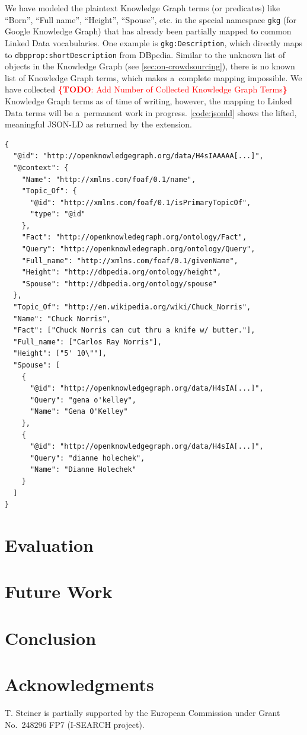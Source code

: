 \documentclass[runningheads,a4paper]{llncs}
\newcommand{\todo}[1]{\noindent\textcolor{red}{{\bf \{TODO}: #1{\bf \}}}}
\begin{document}
We have modeled the plaintext Knowledge Graph terms (or predicates)
like ``Born'', ``Full name'', ``Height'', ``Spouse'', etc.
in the special namespace \texttt{gkg} (for Google Knowledge Graph)
that has already been partially mapped to common Linked Data vocabularies.
One example is \texttt{gkg:Description},
which directly maps to \texttt{dbpprop:shortDescription} from DBpedia.
Similar to the unknown list of objects in the Knowledge Graph (see \autoref{sec:on-crowdsourcing}),
there is no known list of Knowledge Graph terms,
which makes a~complete mapping impossible.
We have collected \todo{Add Number of Collected Knowledge Graph Terms} Knowledge Graph terms
as of time of writing, however, the mapping to Linked Data terms
will be a~permanent work in progress.
\autoref{code:jsonld} shows the lifted, meaningful JSON-LD as returned by the extension.

\begin{lstlisting}[caption=Subset of the meaningful JSON-LD from the Chuck Norris Knowledge Graph data. The mapping of the Knowledge Graph terms can be seen in the @context., label=code:jsonld, float=h, escapechar=§]
{
  "@id": "http://openknowledgegraph.org/data/H4sIAAAAA[...]",
  "@context": {
    "Name": "http://xmlns.com/foaf/0.1/name",
    "Topic_Of": {
      "@id": "http://xmlns.com/foaf/0.1/isPrimaryTopicOf",
      "type": "@id"
    },
    "Fact": "http://openknowledegraph.org/ontology/Fact",
    "Query": "http://openknowledegraph.org/ontology/Query",
    "Full_name": "http://xmlns.com/foaf/0.1/givenName",
    "Height": "http://dbpedia.org/ontology/height",
    "Spouse": "http://dbpedia.org/ontology/spouse"
  },
  "Topic_Of": "http://en.wikipedia.org/wiki/Chuck_Norris",
  "Name": "Chuck Norris",
  "Fact": ["Chuck Norris can cut thru a knife w/ butter."],
  "Full_name": ["Carlos Ray Norris"],
  "Height": ["5' 10\""],
  "Spouse": [
    {
      "@id": "http://openknowledgegraph.org/data/H4sIA[...]",
      "Query": "gena o'kelley",
      "Name": "Gena O'Kelley"
    },
    {
      "@id": "http://openknowledgegraph.org/data/H4sIA[...]",
      "Query": "dianne holechek",
      "Name": "Dianne Holechek"
    }
  ]
}
\end{lstlisting} 

\section{Evaluation}

\section{Future Work}

\section{Conclusion}

\section*{Acknowledgments}
T. Steiner is partially supported by the European Commission
under Grant No.~248296 FP7 (\mbox{I-SEARCH} project).



\end{document}
